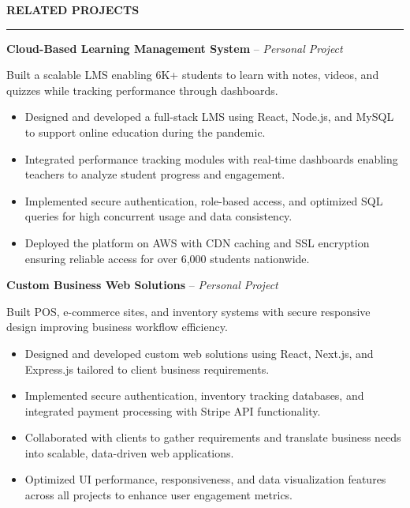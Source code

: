 \documentclass[10pt,letterpaper]{article}
\begin{document}
\vspace{6pt}

\textbf{RELATED PROJECTS}\\[-8pt]
\noindent\rule{\textwidth}{1pt}

\vspace{-2pt}

\textbf{Cloud-Based Learning Management System} -- \emph{Personal Project}

\vspace{-1pt}

Built a scalable LMS enabling 6K+ students to learn with notes, videos, and quizzes while tracking performance through dashboards.
\vspace{-1pt}
\begin{itemize}
\item Designed and developed a full-stack LMS using React, Node.js, and MySQL to support online education during the pandemic.
\item Integrated performance tracking modules with real-time dashboards enabling teachers to analyze student progress and engagement.
\item Implemented secure authentication, role-based access, and optimized SQL queries for high concurrent usage and data consistency.
\item Deployed the platform on AWS with CDN caching and SSL encryption ensuring reliable access for over 6,000 students nationwide.
\end{itemize}

\textbf{Custom Business Web Solutions} -- \emph{Personal Project}

\vspace{-1pt}

Built POS, e-commerce sites, and inventory systems with secure responsive design improving business workflow efficiency.
\vspace{-1pt}
\begin{itemize}
\item Designed and developed custom web solutions using React, Next.js, and Express.js tailored to client business requirements.
\item Implemented secure authentication, inventory tracking databases, and integrated payment processing with Stripe API functionality.
\item Collaborated with clients to gather requirements and translate business needs into scalable, data-driven web applications.
\item Optimized UI performance, responsiveness, and data visualization features across all projects to enhance user engagement metrics.
\end{itemize}
\end{document}
